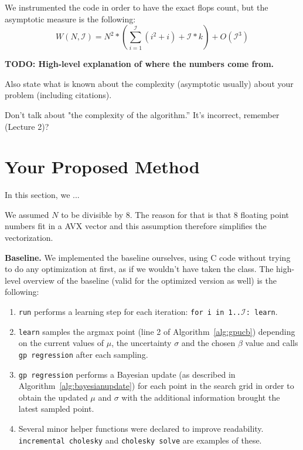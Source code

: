 \documentclass[letterpaper]{article}
\newcommand{\mypar}[1]{{\bf #1.}}
\begin{document}
We instrumented the code in order to have the exact flops count, but the asymptotic measure is the following:
\begin{equation*}
    W(N, \mathcal{I}) = N^2*\left(\sum_{i=1}^\mathcal{I}(i^2 + i) + \mathcal{I} * k\right) + O(\mathcal{I}^3)
\end{equation*}

\textbf{TODO: High-level explanation of where the numbers come from.}

Also state what is
known about the complexity (asymptotic usually) 
about your problem (including citations).

Don't talk about "the complexity of the algorithm.'' It's incorrect,
remember (Lecture 2)?


\section{Your Proposed Method}\label{sec:yourmethod}

In this section, we ...

We assumed $N$ to be divisible by 8. The reason for that is that 8 floating point numbers fit in a AVX vector and this assumption therefore simplifies the vectorization.

\mypar{Baseline} We implemented the baseline ourselves, using C code without trying to do any optimization at first, as if we wouldn't have taken the class. The high-level overview of the baseline (valid for the optimized version as well) is the following:
\begin{enumerate}
    \item \texttt{run} performs a learning step for each iteration: \texttt{for i in 1..$\mathcal{I}$: learn}.
    \item \texttt{learn} samples the argmax point (line 2 of Algorithm~\ref{alg:gpucb}) depending on the current values of $\mu$, the uncertainty $\sigma$ and the chosen $\beta$ value and calls \texttt{gp regression} after each sampling.
    \item \texttt{gp regression} performs a Bayesian update (as described in Algorithm~\ref{alg:bayesianupdate}) for each point in the search grid in order to obtain the updated $\mu$ and $\sigma$ with the additional information brought the latest sampled point.
    \item Several minor helper functions were declared to improve readability. \texttt{incremental cholesky} and \texttt{cholesky solve} are examples of these.
\end{enumerate}
\end{document}
